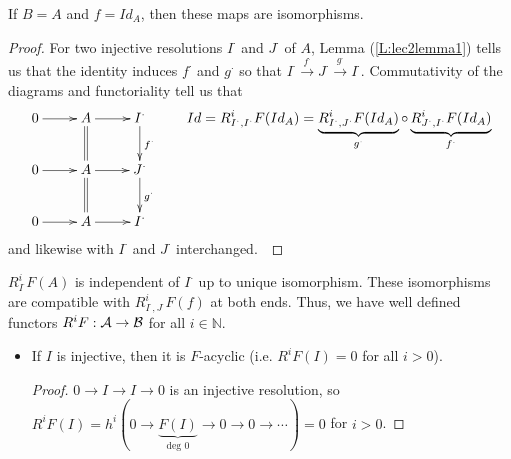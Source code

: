 \begin{corollary}
If $B=A$ and $f=Id_A$, then these maps are isomorphisms.
\end{corollary}
\begin{proof}
For two injective resolutions $I^{\cdot}$ and $J^{\cdot}$ of $A$,
Lemma (\ref{L:lec2lemma1}) tells us that the identity induces
$f^{\cdot}$ and $g^{\cdot}$ so that
$I^{\cdot}\xrightarrow{f^{\cdot}} J^{\cdot}
\xrightarrow{g^{\cdot}} I^{\cdot}$. Commutativity of the diagrams
and functoriality tell us that \[\xymatrix{
 0 \ar[r] & A \ar[r]\ar@{=}[d] & I^{\cdot}\ar[d]^{f^{\cdot}}\\
 0 \ar[r] & A \ar[r]\ar@{=}[d] & J^{\cdot}\ar[d]^{g^{\cdot}}\\
 0 \ar[r] & A \ar[r] & I^{\cdot}
 } \qquad Id =
R_{I^{\cdot},I^{\cdot}}^iF(Id_A) =
\underbrace{R_{I^{\cdot},J^{\cdot}}^iF(Id_A)}_{g^{\cdot}} \circ
\underbrace{R_{J^{\cdot},I^{\cdot}}^iF(Id_A)}_{f^{\cdot}}
\]
and likewise with $I^{\cdot}$ and $J^{\cdot}$ interchanged.\
\end{proof}

\begin{corollary}
$R_{I^{\cdot}}^iF(A)$ is independent of $I^{\cdot}$ up to unique
isomorphism.  These isomorphisms are compatible with
$R_{I^{\cdot},J^{\cdot}}^iF(f)$ at both ends.  Thus, we have well
defined functors $R^iF:\mathcal{A}\to \mathcal{B}$ for all $i\in
\mathbb{N}$.
\end{corollary}

\begin{remark}
\begin{itemize}
 \item[]\hspace{-1.3cm} If $I$ is injective, then it is
$F$-acyclic (i.e. $R^iF(I)=0$ for all $i>0$).
\begin{proof}
$0\to I\to I \to 0$ is an injective resolution, so $R^iF(I) =
h^i(0\to \underbrace{F(I)}_{\text{deg 0}}\to 0\to 0\to \cdots) =0$
for $i>0$.
\end{proof}
\end{itemize}
\end{remark}

